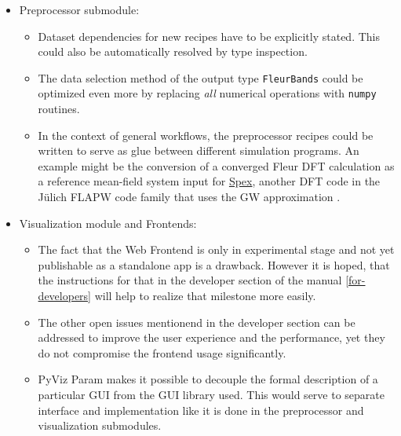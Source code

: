 \begin{itemize}
\item Preprocessor submodule:
    \begin{itemize}
    \item Dataset dependencies for new recipes have to be explicitly stated.
        This could also be automatically resolved by type inspection.
    \item The data selection method of the output type \texttt{FleurBands} could
        be optimized even more by replacing \textit{all} numerical operations
        with \texttt{numpy} routines.
    \item In the context of general workflows, the preprocessor recipes could be
        written to serve as glue between different simulation programs. An
        example might be the conversion of a converged Fleur DFT calculation as
        a reference mean-field system input for
        \href{https://spex.readthedocs.io/en/master/spex_and_fleur.html#old-fleur}{Spex},
        another DFT code in the Jülich FLAPW code family that uses the GW
        approximation \cite{fleur-spex}.
    \end{itemize}
\item Visualization module and Frontends:
    \begin{itemize}
    \item The fact that the Web Frontend is only in experimental stage and not
        yet publishable as a standalone app is a drawback. However it is hoped,
        that the instructions for that in the developer section of the manual
        \vref{for-developers} will help to realize that milestone more easily. 
    \item The other open issues mentionend in the developer section can be addressed to improve the user
        experience and the performance, yet they do not compromise the frontend
        usage significantly.
    \item PyViz Param \cite{pyviz-param} makes it possible to decouple the
        formal description of a particular GUI from the GUI library used. This
        would serve to separate interface and implementation like it is done in
        the preprocessor and visualization submodules.
    \end{itemize}
\end{itemize}


